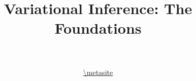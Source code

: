\documentclass[14pt]{beamer}
\title[VI]{Variational Inference: The Foundations}
\date{}
\author[VI Tutorial @ \metahost]{ \metaauthor \\ 
~\\
\url{\metasite}
}
\institute[]{\metaack}
\begin{document}
\frame{\titlepage}



\end{document}
